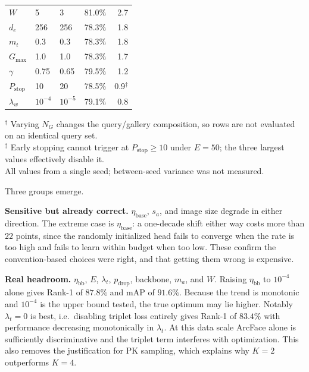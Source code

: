 \documentclass[conference]{IEEEtran}
\begin{document}
\begin{table}[t]
\begin{tabular}{@{}lllrr@{}}
    $W$                  & 5             & 3             & 81.0\%            & 2.7            \\
    $d_e$                & 256           & 256           & 78.3\%            & 1.8            \\
    $m_t$                & 0.3           & 0.3           & 78.3\%            & 1.8            \\
    $G_{\max}$           & 1.0           & 1.0           & 78.3\%            & 1.7            \\
    $\gamma$             & 0.75          & 0.65          & 79.5\%            & 1.2            \\
    $P_{\text{stop}}$    & 10            & 20            & 78.5\%            & 0.9$^\ddagger$ \\
    $\lambda_w$          & $10^{-4}$     & $10^{-5}$     & 79.1\%            & 0.8            \\
    \bottomrule
  \end{tabular}
  \vspace{2pt}
  \raggedright\scriptsize
  $^\dagger$ Varying $N_G$ changes the query/gallery composition, so rows are not
  evaluated on an identical query set. \\
  $^\ddagger$ Early stopping cannot trigger at $P_{\text{stop}} \geq 10$ under $E=50$;
  the three largest values effectively disable it. \\
  All values from a single seed; between-seed variance was not measured.
\end{table}

Three groups emerge.

\textbf{Sensitive but already correct.} $\eta_{\text{base}}$, $s_a$, and image size
degrade in either direction. The extreme case is $\eta_{\text{base}}$: a one-decade
shift either way costs more than $22$ points, since the randomly initialized head fails
to converge when the rate is too high and fails to learn within budget when too low.
These confirm the convention-based choices were right, and that getting them wrong is
expensive.

\textbf{Real headroom.} $\eta_{\text{bb}}$, $E$, $\lambda_t$, $p_{\text{drop}}$,
backbone, $m_a$, and $W$. Raising $\eta_{\text{bb}}$ to $10^{-4}$ alone gives Rank-1 of
$87.8\%$ and mAP of $91.6\%$. Because the trend is monotonic and $10^{-4}$ is the upper
bound tested, the true optimum may lie higher. Notably $\lambda_t = 0$ is best,
i.e.\ disabling triplet loss entirely gives Rank-1 of $83.4\%$ with performance
decreasing monotonically in $\lambda_t$. At this data scale ArcFace alone is
sufficiently discriminative and the triplet term interferes with optimization. This also
removes the justification for PK sampling, which explains why $K=2$ outperforms $K=4$.
\end{document}
